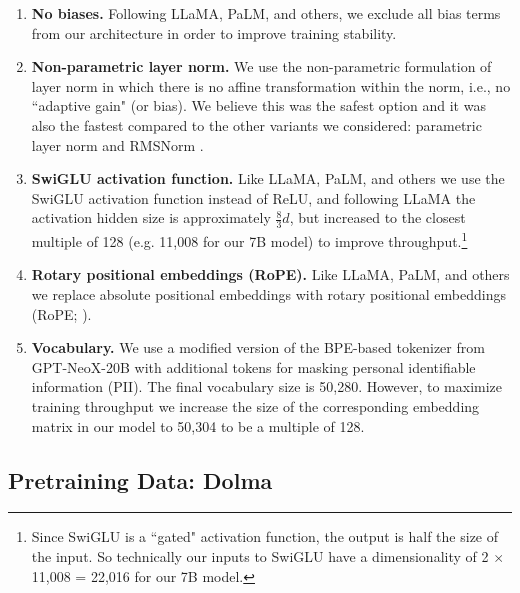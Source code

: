 \documentclass[11pt]{article}
\newcommand{\dolma}{Dolma\xspace}
\begin{document}
\begin{enumerate}[itemsep=1mm,leftmargin=4.5mm]
    \item \textbf{No biases.} Following LLaMA, PaLM, and others, we exclude all bias terms from our architecture in order to improve training stability.

    \item \textbf{Non-parametric layer norm.} We use the non-parametric formulation of layer norm \citep{Ba2016LayerNorm} in which there is no affine transformation within the norm, i.e., no ``adaptive gain" (or bias). We believe this was the safest option and it was also the fastest compared to the other variants we considered: parametric layer norm and RMSNorm \citep{RMSNorm}.

    \item \textbf{SwiGLU activation function.} Like LLaMA, PaLM, and others we use the SwiGLU activation function \citep{Shazeer2020GLUVI} instead of ReLU, and following LLaMA the activation hidden size is approximately $\frac{8}{3}d$, but increased to the closest multiple of 128 (e.g. 11,008 for our 7B model) to improve throughput.\footnote{Since SwiGLU is a ``gated" activation function, the output is half the size of the input. So technically our inputs to SwiGLU have a dimensionality of 2 $\times$ 11,008 = 22,016 for our 7B model.}

    \item \textbf{Rotary positional embeddings (RoPE).} Like LLaMA, PaLM, and others we replace absolute positional embeddings with rotary positional embeddings (RoPE; \citealp{Su2021RoFormerET}).

    \item \textbf{Vocabulary.} We use a modified version of the BPE-based tokenizer from GPT-NeoX-20B \citep{gpt-neox-20b} with additional tokens for masking personal identifiable information (PII). The final vocabulary size is 50,280.
    However, to maximize training throughput we increase the size of the corresponding embedding matrix in our model to 50,304 
    to be
    a multiple of 128.
\end{enumerate}

\subsection{Pretraining Data: \dolma} \label{sec:pretraining-data}
\end{document}
